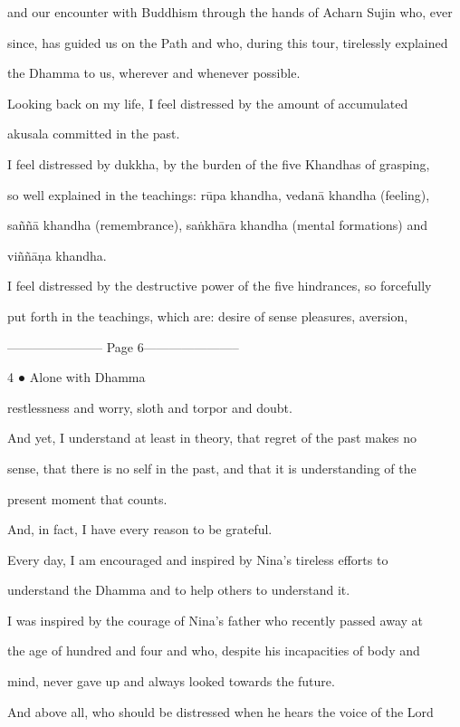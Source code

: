       and our encounter with Buddhism through the hands of Acharn Sujin who, ever  

      since, has guided us on the Path and who, during this tour, tirelessly explained  

      the Dhamma to us, wherever and whenever possible. 

         Looking back on my life, I feel distressed by the amount of accumulated  

      akusala committed in the past. 

         I feel distressed by dukkha, by the burden of the five Khandhas of grasping,  

      so well explained in the teachings: rūpa khandha, vedanā khandha (feeling),  

      saññā khandha (remembrance), saṅkhāra khandha (mental formations) and  

      viññāṇa khandha. 

         I feel distressed by the destructive power of the five hindrances, so forcefully  

      put forth in the teachings, which are: desire of sense pleasures, aversion,  


----------------------- Page 6-----------------------

4 ● Alone with Dhamma 



      restlessness and worry, sloth and torpor and doubt. 

        And yet, I understand at least in theory, that regret of the past makes no  

      sense, that there is no self in the past, and that it is understanding of the  

      present moment that counts. 

        And, in fact, I have every reason to be grateful. 

         Every day, I am encouraged and inspired by Nina’s tireless efforts to  

      understand the Dhamma and to help others to understand it. 

         I was inspired by the courage of Nina’s father who recently passed away at  

      the age of hundred and four and who, despite his incapacities of body and  

      mind, never gave up and always looked towards the future. 

        And above all, who should be distressed when he hears the voice of the Lord  

